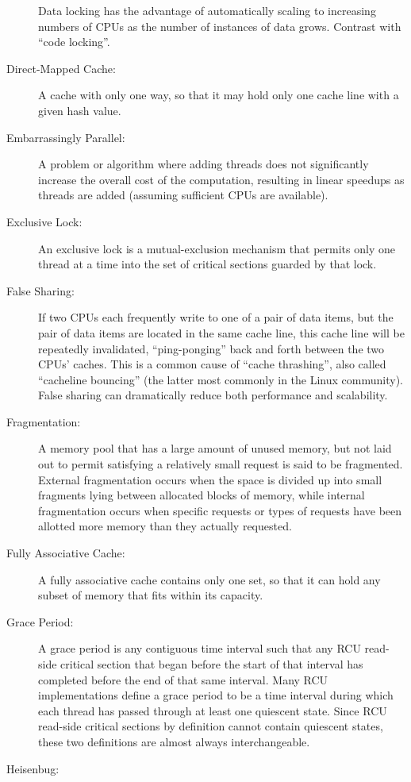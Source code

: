\begin{description}
	Data locking has the advantage of automatically scaling to
	increasing numbers of CPUs as the number of instances of
	data grows.
	Contrast with ``code locking''.
\item[Direct-Mapped Cache:]
	A cache with only one way, so that it may hold only one cache
	line with a given hash value.
\item[Embarrassingly Parallel:]
	A problem or algorithm where adding threads does not significantly
	increase the overall cost of the computation, resulting in
	linear speedups as threads are added (assuming sufficient
	CPUs are available).
\item[Exclusive Lock:]
	An exclusive lock is a mutual-exclusion mechanism that
	permits only one thread at a time into the
	set of critical sections guarded by that lock.
\item[False Sharing:]
	If two CPUs each frequently write to one of a pair of data items,
	but the pair of data items are located in the same cache line,
	this cache line will be repeatedly invalidated, ``ping-ponging''
	back and forth between the two CPUs' caches.
	This is a common cause of ``cache thrashing'', also called
	``cacheline bouncing'' (the latter most commonly in the Linux
	community).
	False sharing can dramatically reduce both performance and
	scalability.
\item[Fragmentation:]
	A memory pool that has a large amount of unused memory, but
	not laid out to permit satisfying a relatively small request
	is said to be fragmented.
	External fragmentation occurs when the space is divided up
	into small fragments lying between allocated blocks of memory,
	while internal fragmentation occurs when specific requests or
	types of requests have been allotted more memory than they
	actually requested.
\item[Fully Associative Cache:]
	A fully associative cache contains only
	one set, so that it can hold any subset of
	memory that fits within its capacity.
\item[Grace Period:]
	A grace period is any contiguous time interval such that
	any RCU read-side critical section that began before the
	start of that interval has
	completed before the end of that same interval.
	Many RCU implementations define a grace period to be a
	time interval during which each thread has passed through at
	least one quiescent state.
	Since RCU read-side critical sections by definition cannot
	contain quiescent states, these two definitions are almost
	always interchangeable.
\item[Heisenbug:]

\end{description}
